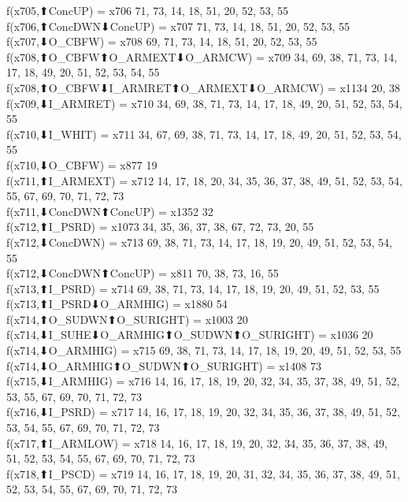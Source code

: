 f(x705,⬆ConcUP) = x706 {71, 73, 14, 18, 51, 20, 52, 53, 55} \\
f(x706,⬆ConcDWN⬇ConcUP) = x707 {71, 73, 14, 18, 51, 20, 52, 53, 55} \\
f(x707,⬇O_CBFW) = x708 {69, 71, 73, 14, 18, 51, 20, 52, 53, 55} \\
f(x708,⬆O_CBFW⬆O_ARMEXT⬇O_ARMCW) = x709 {34, 69, 38, 71, 73, 14, 17, 18, 49, 20, 51, 52, 53, 54, 55} \\
f(x708,⬆O_CBFW⬇I_ARMRET⬆O_ARMEXT⬇O_ARMCW) = x1134 {20, 38} \\
f(x709,⬇I_ARMRET) = x710 {34, 69, 38, 71, 73, 14, 17, 18, 49, 20, 51, 52, 53, 54, 55} \\
f(x710,⬇I_WHIT) = x711 {34, 67, 69, 38, 71, 73, 14, 17, 18, 49, 20, 51, 52, 53, 54, 55} \\
f(x710,⬇O_CBFW) = x877 {19} \\
f(x711,⬆I_ARMEXT) = x712 {14, 17, 18, 20, 34, 35, 36, 37, 38, 49, 51, 52, 53, 54, 55, 67, 69, 70, 71, 72, 73} \\
f(x711,⬇ConcDWN⬆ConcUP) = x1352 {32} \\
f(x712,⬆I_PSRD) = x1073 {34, 35, 36, 37, 38, 67, 72, 73, 20, 55} \\
f(x712,⬇ConcDWN) = x713 {69, 38, 71, 73, 14, 17, 18, 19, 20, 49, 51, 52, 53, 54, 55} \\
f(x712,⬇ConcDWN⬆ConcUP) = x811 {70, 38, 73, 16, 55} \\
f(x713,⬆I_PSRD) = x714 {69, 38, 71, 73, 14, 17, 18, 19, 20, 49, 51, 52, 53, 55} \\
f(x713,⬆I_PSRD⬇O_ARMHIG) = x1880 {54} \\
f(x714,⬆O_SUDWN⬆O_SURIGHT) = x1003 {20} \\
f(x714,⬇I_SUHE⬇O_ARMHIG⬆O_SUDWN⬆O_SURIGHT) = x1036 {20} \\
f(x714,⬇O_ARMHIG) = x715 {69, 38, 71, 73, 14, 17, 18, 19, 20, 49, 51, 52, 53, 55} \\
f(x714,⬇O_ARMHIG⬆O_SUDWN⬆O_SURIGHT) = x1408 {73} \\
f(x715,⬇I_ARMHIG) = x716 {14, 16, 17, 18, 19, 20, 32, 34, 35, 37, 38, 49, 51, 52, 53, 55, 67, 69, 70, 71, 72, 73} \\
f(x716,⬇I_PSRD) = x717 {14, 16, 17, 18, 19, 20, 32, 34, 35, 36, 37, 38, 49, 51, 52, 53, 54, 55, 67, 69, 70, 71, 72, 73} \\
f(x717,⬆I_ARMLOW) = x718 {14, 16, 17, 18, 19, 20, 32, 34, 35, 36, 37, 38, 49, 51, 52, 53, 54, 55, 67, 69, 70, 71, 72, 73} \\
f(x718,⬆I_PSCD) = x719 {14, 16, 17, 18, 19, 20, 31, 32, 34, 35, 36, 37, 38, 49, 51, 52, 53, 54, 55, 67, 69, 70, 71, 72, 73} \\
